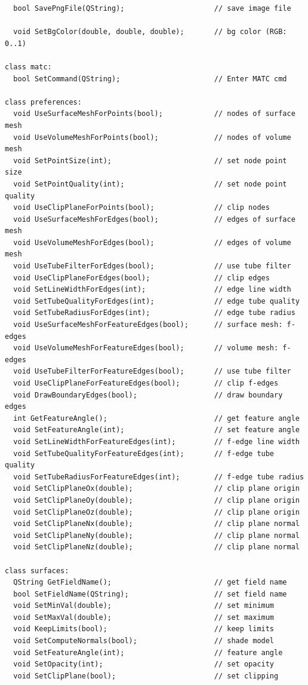 \documentclass[a4paper,12pt]{article}
\begin{document}
\begin{footnotesize}
\begin{verbatim}
  bool SavePngFile(QString);                     // save image file

  void SetBgColor(double, double, double);       // bg color (RGB: 0..1)

class matc:
  bool SetCommand(QString);                      // Enter MATC cmd

class preferences:
  void UseSurfaceMeshForPoints(bool);            // nodes of surface mesh
  void UseVolumeMeshForPoints(bool);             // nodes of volume mesh
  void SetPointSize(int);                        // set node point size
  void SetPointQuality(int);                     // set node point quality
  void UseClipPlaneForPoints(bool);              // clip nodes
  void UseSurfaceMeshForEdges(bool);             // edges of surface mesh
  void UseVolumeMeshForEdges(bool);              // edges of volume mesh
  void UseTubeFilterForEdges(bool);              // use tube filter
  void UseClipPlaneForEdges(bool);               // clip edges
  void SetLineWidthForEdges(int);                // edge line width
  void SetTubeQualityForEdges(int);              // edge tube quality
  void SetTubeRadiusForEdges(int);               // edge tube radius
  void UseSurfaceMeshForFeatureEdges(bool);      // surface mesh: f-edges
  void UseVolumeMeshForFeatureEdges(bool);       // volume mesh: f-edges
  void UseTubeFilterForFeatureEdges(bool);       // use tube filter
  void UseClipPlaneForFeatureEdges(bool);        // clip f-edges
  void DrawBoundaryEdges(bool);                  // draw boundary edges
  int GetFeatureAngle();                         // get feature angle
  void SetFeatureAngle(int);                     // set feature angle
  void SetLineWidthForFeatureEdges(int);         // f-edge line width
  void SetTubeQualityForFeatureEdges(int);       // f-edge tube quality
  void SetTubeRadiusForFeatureEdges(int);        // f-edge tube radius
  void SetClipPlaneOx(double);                   // clip plane origin
  void SetClipPlaneOy(double);                   // clip plane origin
  void SetClipPlaneOz(double);                   // clip plane origin
  void SetClipPlaneNx(double);                   // clip plane normal
  void SetClipPlaneNy(double);                   // clip plane normal
  void SetClipPlaneNz(double);                   // clip plane normal

class surfaces:
  QString GetFieldName();                        // get field name
  bool SetFieldName(QString);                    // set field name
  void SetMinVal(double);                        // set minimum
  void SetMaxVal(double);                        // set maximum
  void KeepLimits(bool);                         // keep limits
  void SetComputeNormals(bool);                  // shade model
  void SetFeatureAngle(int);                     // feature angle
  void SetOpacity(int);                          // set opacity
  void SetClipPlane(bool);                       // set clipping


\end{verbatim}
\end{footnotesize}
\end{document}
